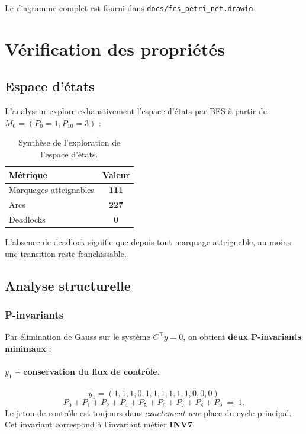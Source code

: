 \documentclass[11pt,a4paper]{article}
\newcommand{\code}[1]{\texttt{#1}}
\begin{document}
Le diagramme complet est fourni dans \code{docs/fcs\_petri\_net.drawio}.

\section{Vérification des propriétés}

\subsection{Espace d'états}

L'analyseur explore exhaustivement l'espace d'états par BFS à partir de
$M_0 = (P_0=1, P_{10}=3)$ :

\begin{table}[H]
\centering\small
\begin{tabular}{l c}
\toprule
\rowcolor{tableheader}\textbf{Métrique} & \textbf{Valeur} \\
\midrule
Marquages atteignables  & \textbf{111} \\
Arcs                    & \textbf{227} \\
Deadlocks               & \textbf{0}   \\
\bottomrule
\end{tabular}
\caption{Synthèse de l'exploration de l'espace d'états.}
\end{table}

L'absence de deadlock signifie que depuis tout marquage atteignable,
au moins une transition reste franchissable.

\subsection{Analyse structurelle}

\subsubsection{P-invariants}

Par élimination de Gauss sur le système $C^\top y = 0$, on obtient
\textbf{deux P-invariants minimaux} :

\paragraph{$y_1$ -- conservation du flux de contrôle.}
\[
y_1 = (1,1,1,0,1,1,1,1,1,1,0,0,0)
\]
\[
P_0 + P_1 + P_2 + P_4 + P_5 + P_6 + P_7 + P_8 + P_9 \;=\; 1.
\]
Le jeton de contrôle est toujours dans \emph{exactement une} place du cycle
principal. Cet invariant correspond à l'invariant métier \textbf{INV7}.
\end{document}
